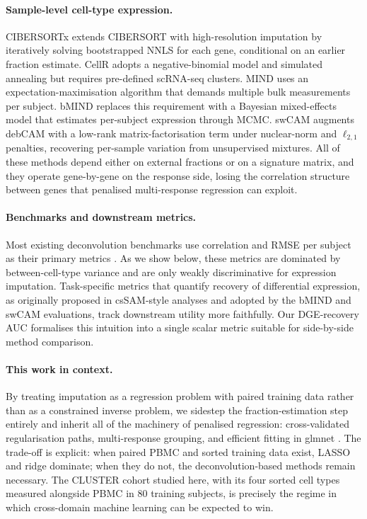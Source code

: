 \paragraph{Sample-level cell-type expression.} CIBERSORTx \cite{newman2019cibersortx} extends CIBERSORT with high-resolution imputation by iteratively solving bootstrapped NNLS for each gene, conditional on an earlier fraction estimate. CellR adopts a negative-binomial model and simulated annealing but requires pre-defined scRNA-seq clusters. MIND \cite{wang2020mind} uses an expectation-maximisation algorithm that demands multiple bulk measurements per subject. bMIND \cite{wang2024bmind} replaces this requirement with a Bayesian mixed-effects model that estimates per-subject expression through MCMC. swCAM \cite{chen2022swcam} augments debCAM with a low-rank matrix-factorisation term under nuclear-norm and $\ell_{2,1}$ penalties, recovering per-sample variation from unsupervised mixtures. All of these methods depend either on external fractions or on a signature matrix, and they operate gene-by-gene on the response side, losing the correlation structure between genes that penalised multi-response regression can exploit.

\paragraph{Benchmarks and downstream metrics.} Most existing deconvolution benchmarks use correlation and RMSE per subject as their primary metrics \cite{avilacobos2020benchmarking,monaco2019rnaseq}. As we show below, these metrics are dominated by between-cell-type variance and are only weakly discriminative for expression imputation. Task-specific metrics that quantify recovery of differential expression, as originally proposed in csSAM-style analyses \cite{shenorr2010cssam} and adopted by the bMIND and swCAM evaluations, track downstream utility more faithfully. Our DGE-recovery AUC formalises this intuition into a single scalar metric suitable for side-by-side method comparison.

\paragraph{This work in context.} By treating imputation as a regression problem with paired training data rather than as a constrained inverse problem, we sidestep the fraction-estimation step entirely and inherit all of the machinery of penalised regression: cross-validated regularisation paths, multi-response grouping, and efficient fitting in glmnet \cite{friedman2010glmnet}. The trade-off is explicit: when paired PBMC and sorted training data exist, LASSO and ridge dominate; when they do not, the deconvolution-based methods remain necessary. The CLUSTER cohort studied here, with its four sorted cell types measured alongside PBMC in 80 training subjects, is precisely the regime in which cross-domain machine learning can be expected to win.
